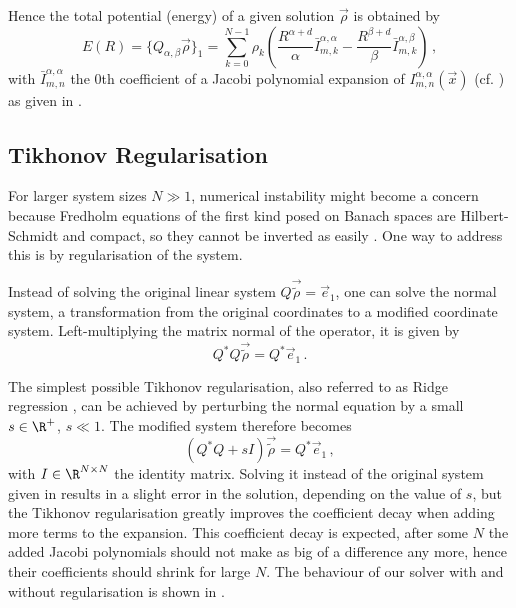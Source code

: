 
Hence the total potential (energy) of a given solution $\vec{\rho}$ is obtained by
\begin{equation}
  E(R) = \{Q_{\alpha,\beta} \vec{\rho}\}_1 = \sum_{k=0}^{N-1} \rho_k \left(\frac{R^{\alpha+d}}{\alpha} \bar{I}_{m,k}^{\alpha,\alpha} - \frac{R^{\beta+d}}{\beta} \bar{I}_{m,k}^{\alpha,\beta}\right)\,,
  \label{eq:total-energy-for-ansatz}
\end{equation}
with $\bar{I}_{m,n}^{\alpha,\alpha}$ the 0th coefficient of a Jacobi polynomial expansion of $I_{m,n}^{\alpha,\alpha}(\vec{x})$ (cf. ) as given in .

\subsection{Tikhonov Regularisation}
For larger system sizes $N \gg 1$, numerical instability might become a concern because Fredholm equations of the first kind posed on Banach spaces are Hilbert-Schmidt and compact, so they cannot be inverted as easily \parencite{2021-arbitrary-dimensions}.
One way to address this is by regularisation of the system.

Instead of solving the original linear system $Q \vec{\tilde{\rho}} = \vec{e}_1$, one can solve the normal system, a transformation from the original coordinates to a modified coordinate system.
Left-multiplying the matrix normal of the operator, it is given by
$$Q^* Q \vec{\tilde{\rho}} = Q^* \vec{e}_1\,.$$

The simplest possible Tikhonov regularisation, also referred to as Ridge regression \parencite{1970-ridge-regression}, can be achieved by perturbing the normal equation by a small $s \in \R^+$, $s \ll 1$.
The modified system therefore becomes
$$(Q^* Q + sI) \vec{\tilde{\rho}} = Q^* \vec{e}_1\,,$$
with $I \in \R^{N \times N}$ the identity matrix.
Solving it instead of the original system given in  results in a slight error in the solution, depending on the value of $s$, but the Tikhonov regularisation greatly improves the coefficient decay when adding more terms to the expansion. %
This coefficient decay is expected, after some $N$ the added Jacobi polynomials should not make as big of a difference any more, hence their coefficients should shrink for large $N$.
The behaviour of our solver with and without regularisation is shown in .
